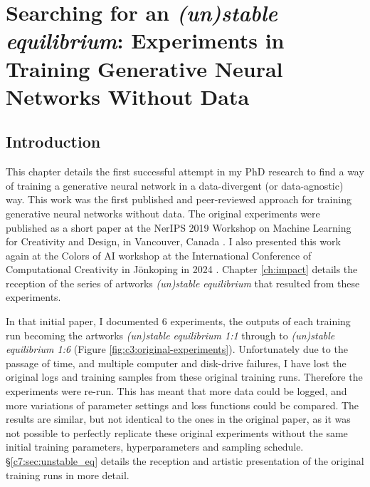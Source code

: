 \chapter{Searching for an \textit{(un)stable equilibrium}:
Experiments in Training Generative Neural Networks Without Data}
\label{ch:unstable_eq}

\section{Introduction}

This chapter details the first successful attempt in my PhD research to find a way of training a generative neural network in a data-divergent (or data-agnostic) way. 
This work was the first published and peer-reviewed approach for training generative neural networks without data.
The original experiments were published as a short paper at the NerIPS 2019 Workshop on Machine Learning for Creativity and Design, in Vancouver, Canada \citep{broad2019searching}. 
I also presented this work again at the Colors of AI workshop at the International Conference of Computational Creativity in Jönkoping in 2024 \citep{riccio2024colours}.
Chapter \ref{ch:impact} details the reception of the series of artworks \textit{(un)stable equilibrium} that resulted from these experiments. 

In that initial paper, I documented 6 experiments, the outputs of each training run becoming the artworks \textit{(un)stable equilibrium 1:1} through to \textit{(un)stable equilibrium 1:6} (Figure \ref{fig:c3:original-experiments}). 
Unfortunately due to the passage of time, and multiple computer and disk-drive failures, I have lost the original logs and training samples from these original training runs. 
Therefore the experiments were re-run.
This has meant that more data could be logged, and more variations of parameter settings and loss functions could be compared.
The results are similar, but not identical to the ones in the original paper, as it was not possible to perfectly replicate these original experiments without the same initial training parameters, hyperparameters and sampling schedule. 
\S \ref{c7:sec:unstable_eq} details the reception and artistic presentation of the original training runs in more detail. 

